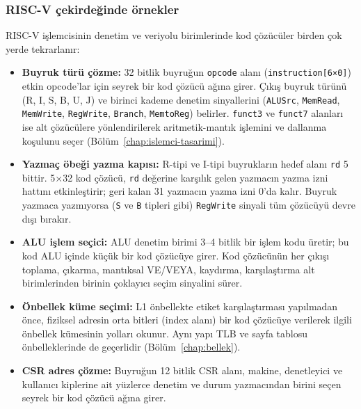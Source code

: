 \begin{ornek}[B.10]
\begin{center}
\end{center}
\end{ornek}


\subsubsection{RISC-V çekirdeğinde örnekler}
RISC-V işlemcisinin denetim ve veriyolu birimlerinde kod çözücüler birden çok yerde tekrarlanır:

\begin{itemize}[nosep]
  \item \textbf{Buyruk türü çözme:} 32 bitlik buyruğun \texttt{opcode} alanı (\texttt{instruction[6×0]}) etkin opcode'lar için seyrek bir kod çözücü ağına girer. Çıkış buyruk türünü (R, I, S, B, U, J) ve birinci kademe denetim sinyallerini (\texttt{ALUSrc}, \texttt{MemRead}, \texttt{MemWrite}, \texttt{RegWrite}, \texttt{Branch}, \texttt{MemtoReg}) belirler. \texttt{funct3} ve \texttt{funct7} alanları ise alt çözücülere yönlendirilerek aritmetik-mantık işlemini ve dallanma koşulunu seçer (Bölüm~\ref{chap:islemci-tasarimi}).
  \item \textbf{Yazmaç öbeği yazma kapısı:} R-tipi ve I-tipi buyrukların hedef alanı \texttt{rd} 5 bittir. 5×32 kod çözücü, \texttt{rd} değerine karşılık gelen yazmacın yazma izni hattını etkinleştirir; geri kalan 31 yazmacın yazma izni 0'da kalır. Buyruk yazmaca yazmıyorsa (\texttt{S} ve \texttt{B} tipleri gibi) \texttt{RegWrite} sinyali tüm çözücüyü devre dışı bırakır.
  \item \textbf{ALU işlem seçici:} ALU denetim birimi 3--4 bitlik bir işlem kodu üretir; bu kod ALU içinde küçük bir kod çözücüye girer. Kod çözücünün her çıkışı toplama, çıkarma, mantıksal VE/VEYA, kaydırma, karşılaştırma alt birimlerinden birinin çoklayıcı seçim sinyalini sürer.
  \item \textbf{Önbellek küme seçimi:} L1 önbellekte etiket karşılaştırması yapılmadan önce, fiziksel adresin orta bitleri (index alanı) bir kod çözücüye verilerek ilgili önbellek kümesinin yolları okunur. Aynı yapı TLB ve sayfa tablosu önbelleklerinde de geçerlidir (Bölüm~\ref{chap:bellek}).
  \item \textbf{CSR adres çözme:} Buyruğun 12 bitlik CSR alanı, makine, denetleyici ve kullanıcı kiplerine ait yüzlerce denetim ve durum yazmacından birini seçen seyrek bir kod çözücü ağına girer.
\end{itemize}


